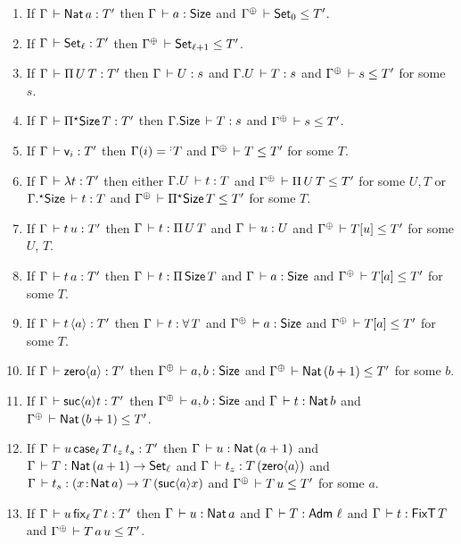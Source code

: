 \documentclass[acmlarge,review,anonymous]{acmart}\settopmatter{printfolios=true}
\newcommand{\LONGVERSION}[1]{}
\begin{document}
\LONGVERSION{
\begin{corollary}[Partial resurrection for substitution equality]
  If\/ $\sueq \Gamma \sigma {\sigma'} {\tau} \Delta$ then
  $\sueq {\resurrect \Gamma} \tau \tau \tau {\resurrect \Delta}$.
\end{corollary}
}

\begin{lemma}
\label{lem:invty} \bla
\begin{enumerate}
\item If\/ $\Gamma \der \Nat a : T'$ then $\Gamma \der a : \Size$ and $\resurrect\Gamma \der \Set[0] \leq T'$.
\item If\/ $\Gamma \der \Set[\ell] : T'$ then $\resurrect\Gamma \der \Set[\ell+1] \leq T'$.
\item If\/ $\Gamma \der \piT U T : T'$ then $\Gamma \der U : s$ and $\cext \Gamma U \der T : s$ and $\resurrect\Gamma \der s \leq T'$ for some $s$.
\item If\/ $\Gamma \der \epiT \Size T : T'$ then $\cext\Gamma \Size \der T : s$ and $\resurrect\Gamma \der s \leq T'$.
\item If\/ $\Gamma \der \ind i : T'$ then $\Gamma(i) = \erann[\noterased] T$ and $\resurrect\Gamma \der T \leq T'$ for some $T$.
\item If\/ $\Gamma \der \lambda t : T'$ then either
  $\cext \Gamma U \der t : T$
  and
  $\resurrect\Gamma \der \piT U T \leq T'$
  for some $U,T$ or
  $\eext \Gamma \Size \der t : T$
  and
  $\resurrect\Gamma \der \epiT\Size T \leq T'$
  for some $T$.
\item If\/ $\Gamma \der t\,u : T'$ then $\Gamma \der t : \piT U T$ and $\Gamma \der u : U$ and $\resurrect\Gamma \der T[u] \leq T'$ for some $U$, $T$.
\item If\/ $\Gamma \der t\,a : T'$ then $\Gamma \der t : \piT \Size T$ and $\Gamma \der a : \Size$ and $\resurrect\Gamma \der T[a] \leq T'$ for some $T$.
\item If\/ $\Gamma \der t\,\ann a : T'$ then $\Gamma \der t : \forallT T$ and $\resurrect\Gamma \der a : \Size$ and $\resurrect\Gamma \der T[a] \leq T'$ for some $T$.
\item If\/ $\Gamma \der \zero a : T'$ then $\resurrect \Gamma \der a,b : \Size$ and $\resurrect\Gamma \der \Nat (b + 1) \leq T'$ for some $b$.
\item If\/ $\Gamma \der \suc a t : T'$ then $\resurrect \Gamma \der a,b : \Size$ and $\Gamma \der t : \Nat b$ and $\resurrect\Gamma \der \Nat(b+1) \leq T'$.
\item If\/ $\Gamma \der u\,\case[\ell] T {t_z} {t_s} : T'$ then $\Gamma \der u : \Nat (a+1)$ and $\Gamma \der T : \Nat(a+1) \to \Set[\ell]$ and $\Gamma \der t_z : T\,(\zero a)$ and $\Gamma \der t_s : \funT x {\Nat a} {T\,(\suc a x)}$ and $\resurrect\Gamma \der T\,u \leq T'$ for some $a$.
\item If\/ $\Gamma \der u\,\fix[\ell] T t : T'$ then $\Gamma \der u : \Nat a$ and $\Gamma \der T : \Adm\,\ell$ and $\Gamma \der t : \FixT\,T$ and $\resurrect\Gamma \der T\,a\,u \leq T'$.
\end{enumerate}
\end{lemma}
\end{document}
